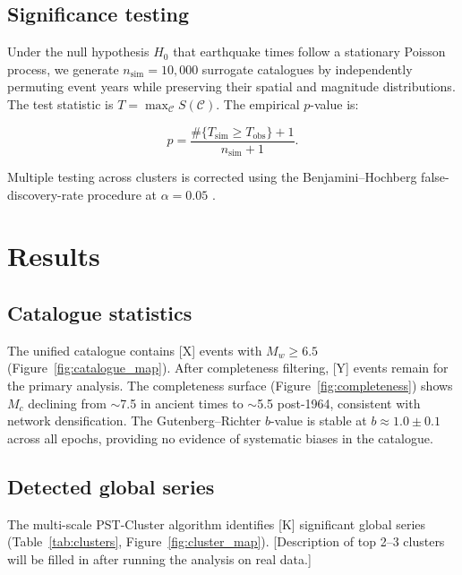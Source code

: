 \documentclass[draft]{agujournal2019}
\begin{document}
\subsection{Significance testing}

Under the null hypothesis $H_0$ that earthquake times follow a stationary
Poisson process, we generate $n_\mathrm{sim} = 10{,}000$ surrogate catalogues
by independently permuting event years while preserving their spatial and
magnitude distributions.  The test statistic is $T = \max_\mathcal{C} S(\mathcal{C})$.
The empirical $p$-value is:

\begin{equation}
  p = \frac{\#\{T_\mathrm{sim} \geq T_\mathrm{obs}\} + 1}{n_\mathrm{sim} + 1}.
  \label{eq:pvalue}
\end{equation}

Multiple testing across clusters is corrected using the
Benjamini–Hochberg false-discovery-rate procedure at $\alpha = 0.05$
\citep{Benjamini1995}.

\section{Results}
\label{sec:results}

\subsection{Catalogue statistics}

The unified catalogue contains [X] events with $M_w \geq 6.5$
(Figure~\ref{fig:catalogue_map}).  After completeness filtering,
[Y] events remain for the primary analysis.  The completeness surface
(Figure~\ref{fig:completeness}) shows $M_c$ declining from $\sim$7.5 in
ancient times to $\sim$5.5 post-1964, consistent with network densification.
The Gutenberg–Richter $b$-value is stable at $b \approx 1.0 \pm 0.1$ across
all epochs, providing no evidence of systematic biases in the catalogue.

\subsection{Detected global series}

The multi-scale PST-Cluster algorithm identifies [K] significant global
series (Table~\ref{tab:clusters}, Figure~\ref{fig:cluster_map}).
[Description of top 2–3 clusters will be filled in after running the
analysis on real data.]
\end{document}
